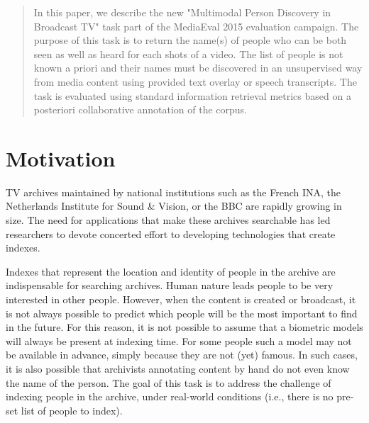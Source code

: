 \documentclass{acm_proc_article-me}
\begin{document}
\maketitle
\begin{abstract}
In this paper, we describe the new "Multimodal Person Discovery in Broadcast TV" task part of the MediaEval 2015 evaluation campaign. The purpose of this task is to return the name(s) of people who can be both seen as well as heard for each shots of a video. The list of people is not known a priori and their names must be discovered in an unsupervised way from media content using provided text overlay or speech transcripts. The task is evaluated using standard information retrieval metrics based on a posteriori collaborative annotation of the corpus.
\end{abstract}

\section{Motivation}

TV archives maintained by national institutions such as the French INA, the Netherlands Institute for Sound \& Vision, or the BBC are rapidly growing in size. The need for applications that make these archives searchable has led researchers to devote concerted effort to developing technologies that create indexes.

Indexes that represent the location and identity of people in the archive are indispensable for searching archives. Human nature leads people to be very interested in other people. However, when the content is created or broadcast, it is not always possible to predict which people will be the most important to find in the future. 
For this reason, it is not possible to assume that a biometric models will always be present at indexing time. For some people such a model may not be available in advance, simply because they are not (yet) famous. In such cases, it is also possible that archivists annotating content by hand do not even know the name of the person. The goal of this task is to address the challenge of indexing people in the archive, under real-world conditions (i.e., there is no pre-set list of people to index). 
\end{document}
